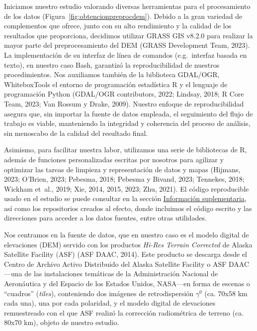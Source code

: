 \documentclass[spanish]{article}
\begin{document}
Iniciamos nuestro estudio valorando diversas herramientas para el
procesamiento de los datos (Figura~\ref{fig:obtencionpreprocdem}).
Debido a la gran variedad de complementos que ofrece, junto con su alto
rendimiento y la calidad de los resultados que proporciona, decidimos
utilizar GRASS GIS v8.2.0 para realizar la mayor parte del
preprocesamiento del DEM (GRASS Development Team, 2023). La
implementación de su interfaz de línea de comandos (e.g.~interfaz basada
en texto), en nuestro caso Bash, garantizó la reproducibilidad de
nuestros procedimientos. Nos auxiliamos también de la biblioteca
GDAL/OGR, WhiteboxTools el entorno de programación estadística R y el
lenguaje de programación Python (GDAL/OGR contributors, 2022; Lindsay,
2018; R Core Team, 2023; Van Rossum y Drake, 2009). Nuestro enfoque de
reproducibilidad asegura que, sin importar la fuente de datos empleada,
el seguimiento del flujo de trabajo es viable, manteniendo la integridad
y coherencia del proceso de análisis, sin menoscabo de la calidad del
resultado final.

Asimismo, para facilitar nuestra labor, utilizamos una serie de
bibliotecas de R, además de funciones personalizadas escritas por
nosotros para agilizar y optimizar las tareas de limpieza y
representación de datos y mapas (Hijmans, 2023; O'Brien, 2023; Pebesma,
2018; Pebesma y Bivand, 2023; Tennekes, 2018; Wickham et~al., 2019; Xie,
2014, 2015, 2023; Zhu, 2021). El código reproducible usado en el estudio
se puede consultar en la sección
\protect\hyperlink{infosupl}{Información suplementaria}, así como los
repositorios creados al efecto, donde incluimos el código escrito y las
direcciones para acceder a los datos fuentes, entre otras utilidades.

Nos centramos en la fuente de datos, que en nuestro caso es el modelo
digital de elevaciones (DEM) servido con los productos \emph{Hi-Res
Terrain Corrected} de Alaska Satellite Facility (ASF) (ASF DAAC, 2014).
Este producto se descarga desde el Centro de Archivo Activo Distribuido
del Alaska Satellite Facility o ASF DAAC---una de las instalaciones
temáticas de la Administración Nacional de Aeronáutica y del Espacio de
los Estados Unidos, NASA---en forma de escenas o ``cuadros''
(\emph{tiles}), conteniendo dos imágenes de retrodispersión \(\gamma^0\)
(ca. 70x58 km cada una), una por cada polaridad, y el modelo digital de
elevaciones remuestreado con el que ASF realizó la corrección
radiométrica de terreno (ca. 80x70 km), objeto de nuestro estudio.
\end{document}
